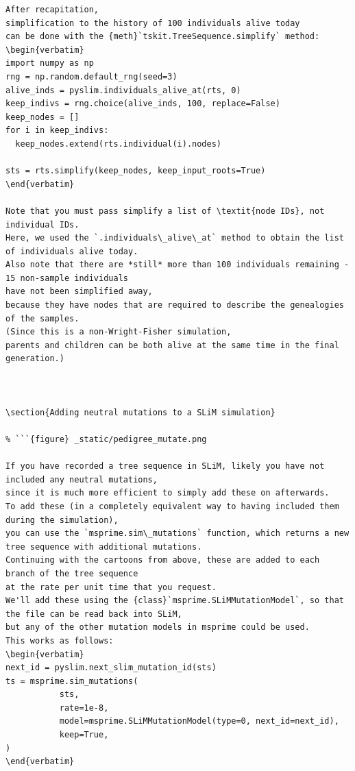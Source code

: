 \documentclass[12pt]{article}
\begin{document}
\begin{lstlisting}[language=slim]
After recapitation,
simplification to the history of 100 individuals alive today
can be done with the {meth}`tskit.TreeSequence.simplify` method:
\begin{verbatim}
import numpy as np
rng = np.random.default_rng(seed=3)
alive_inds = pyslim.individuals_alive_at(rts, 0)
keep_indivs = rng.choice(alive_inds, 100, replace=False)
keep_nodes = []
for i in keep_indivs:
  keep_nodes.extend(rts.individual(i).nodes)

sts = rts.simplify(keep_nodes, keep_input_roots=True)
\end{verbatim}

Note that you must pass simplify a list of \textit{node IDs}, not individual IDs.
Here, we used the `.individuals\_alive\_at` method to obtain the list
of individuals alive today.
Also note that there are *still* more than 100 individuals remaining - 15 non-sample individuals
have not been simplified away,
because they have nodes that are required to describe the genealogies of the samples.
(Since this is a non-Wright-Fisher simulation,
parents and children can be both alive at the same time in the final generation.)



\section{Adding neutral mutations to a SLiM simulation}

% ```{figure} _static/pedigree_mutate.png

If you have recorded a tree sequence in SLiM, likely you have not included any neutral mutations,
since it is much more efficient to simply add these on afterwards.
To add these (in a completely equivalent way to having included them during the simulation),
you can use the `msprime.sim\_mutations` function, which returns a new tree sequence with additional mutations.
Continuing with the cartoons from above, these are added to each branch of the tree sequence
at the rate per unit time that you request.
We'll add these using the {class}`msprime.SLiMMutationModel`, so that the file can be read back into SLiM,
but any of the other mutation models in msprime could be used.
This works as follows:
\begin{verbatim}
next_id = pyslim.next_slim_mutation_id(sts)
ts = msprime.sim_mutations(
           sts,
           rate=1e-8,
           model=msprime.SLiMMutationModel(type=0, next_id=next_id),
           keep=True,
)
\end{verbatim}



\end{lstlisting}
\end{document}
